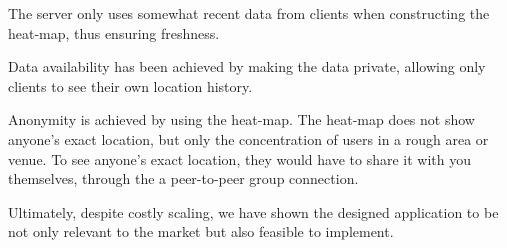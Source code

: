     The server only uses somewhat recent data from clients when constructing the heat-map, thus ensuring freshness.
    
    Data availability has been achieved by making the data private, allowing only clients to see their own location history.
    
    Anonymity is achieved by using the heat-map. The heat-map does not show anyone's exact location, but only the concentration of users in a rough area or venue. To see anyone's exact location, they would have to share it with you themselves, through the a peer-to-peer group connection.  
    
Ultimately, despite costly scaling, we have shown the designed application to be not only relevant to the market but also feasible to implement.
